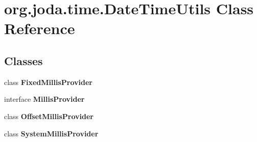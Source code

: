 \hypertarget{classorg_1_1joda_1_1time_1_1_date_time_utils}{\section{org.\-joda.\-time.\-Date\-Time\-Utils Class Reference}
\label{classorg_1_1joda_1_1time_1_1_date_time_utils}
}
\subsection*{Classes}
\begin{DoxyCompactItemize}
\item 
class {\bfseries Fixed\-Millis\-Provider}
\item 
interface {\bfseries Millis\-Provider}
\item 
class {\bfseries Offset\-Millis\-Provider}
\item 
class {\bfseries System\-Millis\-Provider}
\end{DoxyCompactItemize}
